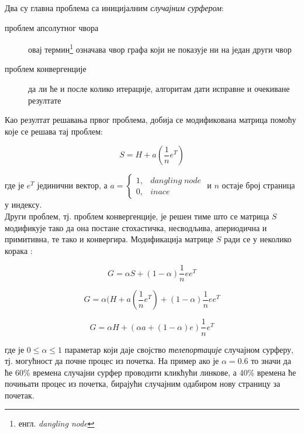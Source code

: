 Два су главна проблема са иницијалним \emph{случајним сурфером}:

\begin{description}
    \item[проблем апсолутног чвора] овај термин\footnote{енгл.
        \emph{dangling node}} означава чвор графа који не показује ни на један други чвор
\item[проблем конвергенције] да ли ће и после колико итерације, алгоритам дати исправне и очекиване резултате
\end{description}

Као резултат решавања првог проблема, добија се модификована матрица помоћу које
се решава тај проблем:

\begin{equation}
S = H + a(\frac{1}{n}e^{T})
\end{equation}

где је $e^T$ јединични вектор, а $a = \left\{\begin{matrix}
1, & dangling\; node \\
0, & inace
\end{matrix}\right.$ и $n$ остаје број страница у индексу.\\

Други проблем, тј. проблем конвергенције, је решен тиме што се матрица $S$
модификује тако да она постане стохастичка, несводљива, апериодична и
примитивна, те тако и конвергира. Модификација матрице $S$ ради се у неколико
корака \cite{langville2011google}:

\begin{equation}
G = \alpha S + (1-\alpha)\frac{1}{n}ee^{T}
\end{equation}

\begin{equation}
G = \alpha(H + a(\frac{1}{n}e^{T})+(1-\alpha)\frac{1}{n}ee^{T}
\end{equation}

\begin{equation}
G = \alpha H + (\alpha a + (1-\alpha)e)\frac{1}{n}e^{T}
\end{equation}

где је $0\leqslant\alpha\leqslant1$ параметар који даје својство \emph{телепортације} случајном сурферу, тј. могућност да почне процес из почетка. На пример ако је $\alpha=0.6$ то значи да ће 60\% времена случајни сурфер проводити кликћући линкове, а 40\% времена ће почињати процес из почетка, бирајући случајним одабиром нову страницу за почетак.

